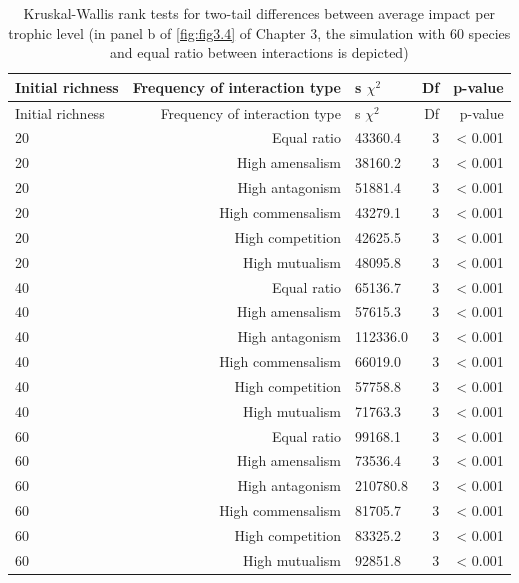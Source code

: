 \begin{longtable}[]{@{}lrlrr@{}}
\caption[Trophic-level impacts]{\color{Gray} Kruskal-Wallis rank tests for two-tail differences between average impact per trophic level (in panel b of \cref{fig:fig3.4} of Chapter 3, the simulation with 60 species and equal ratio between interactions is depicted)}\label{tab:tableApp3.2.5}\\

\toprule
Initial richness & Frequency of interaction type & s \(\chi^2\) & Df & p-value\tabularnewline
\midrule
\endfirsthead
\toprule
Initial richness & Frequency of interaction type & s \(\chi^2\) & Df & p-value\tabularnewline
\midrule
\endhead

20 & Equal ratio & 43360.4 & 3 & \textless{} 0.001\tabularnewline
20 & High amensalism & 38160.2 & 3 & \textless{} 0.001\tabularnewline
20 & High antagonism & 51881.4 & 3 & \textless{} 0.001\tabularnewline
20 & High commensalism & 43279.1 & 3 & \textless{} 0.001\tabularnewline
20 & High competition & 42625.5 & 3 & \textless{} 0.001\tabularnewline
20 & High mutualism & 48095.8 & 3 & \textless{} 0.001\tabularnewline
40 & Equal ratio & 65136.7 & 3 & \textless{} 0.001\tabularnewline
40 & High amensalism & 57615.3 & 3 & \textless{} 0.001\tabularnewline
40 & High antagonism & 112336.0 & 3 & \textless{} 0.001\tabularnewline
40 & High commensalism & 66019.0 & 3 & \textless{} 0.001\tabularnewline
40 & High competition & 57758.8 & 3 & \textless{} 0.001\tabularnewline
40 & High mutualism & 71763.3 & 3 & \textless{} 0.001\tabularnewline
60 & Equal ratio & 99168.1 & 3 & \textless{} 0.001\tabularnewline
60 & High amensalism & 73536.4 & 3 & \textless{} 0.001\tabularnewline
60 & High antagonism & 210780.8 & 3 & \textless{} 0.001\tabularnewline
60 & High commensalism & 81705.7 & 3 & \textless{} 0.001\tabularnewline
60 & High competition & 83325.2 & 3 & \textless{} 0.001\tabularnewline
60 & High mutualism & 92851.8 & 3 & \textless{} 0.001\tabularnewline
\bottomrule

\end{longtable}

